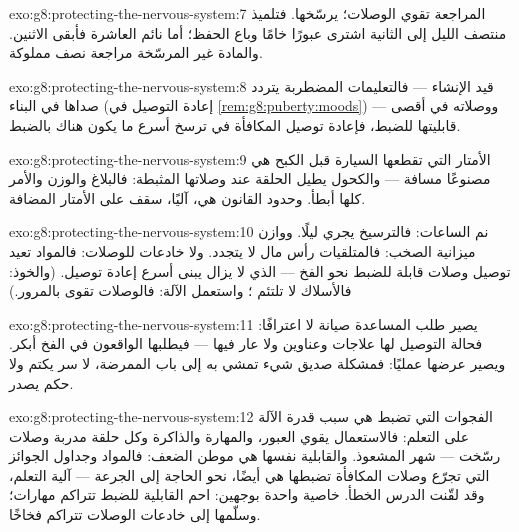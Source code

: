 \begin{solution}{exo:g8:protecting-the-nervous-system:7}
المراجعة تقوي الوصلات؛  يرسّخها. فتلميذ منتصف
الليل إلى الثانية اشترى عبورًا خامًا وباع الحفظ؛ أما
نائم العاشرة فأبقى الاثنين. والمادة غير المرسّخة مراجعة
نصف مملوكة.
\end{solution}

\begin{solution}{exo:g8:protecting-the-nervous-system:8}
  قيد الإنشاء --- فالتعليمات المضطربة
يتردد صداها في البناء (إعادة التوصيل في
\cref{rem:g8:puberty:moods}) --- ووصلاته في أقصى
قابليتها للضبط، فإعادة توصيل المكافأة في  ترسخ
أسرع ما يكون هناك بالضبط.
\end{solution}

\begin{solution}{exo:g8:protecting-the-nervous-system:9}
الأمتار التي تقطعها السيارة قبل الكبح هي 
مصنوعًا مسافة --- والكحول يطيل الحلقة عند وصلاتها
المثبطة: فالبلاغ والوزن والأمر كلها أبطأ. وحدود القانون
هي، آليًا، سقف على الأمتار المضافة.
\end{solution}

\begin{solution}{exo:g8:protecting-the-nervous-system:10}
نم الساعات: فالترسيخ يجري ليلًا. ووازن ميزانية الصخب:
فالمتلقيات رأس مال لا يتجدد. ولا خادعات للوصلات:
فالمواد تعيد توصيل وصلات قابلة للضبط نحو الفخ ---
 الذي لا يزال يبنى أسرع إعادة توصيل. (والخوذ:
فالأسلاك لا تلتئم ؛ واستعمل الآلة: فالوصلات تقوى
بالمرور.)
\end{solution}

\begin{solution}{exo:g8:protecting-the-nervous-system:11}
يصير طلب المساعدة صيانة لا اعترافًا: فحالة التوصيل لها
علاجات وعناوين ولا عار فيها --- فيطلبها الواقعون في الفخ
أبكر. ويصير عرضها عمليًا: فمشكلة صديق شيء تمشي به إلى
باب الممرضة، لا سر يكتم ولا حكم يصدر.
\end{solution}

\begin{solution}{exo:g8:protecting-the-nervous-system:12}
الفجوات التي تضبط هي سبب قدرة الآلة على التعلم:
فالاستعمال يقوي العبور، والمهارة والذاكرة وكل حلقة مدربة
وصلات رسّخت --- شهر المشعوذ. والقابلية نفسها هي موطن
الضعف: فالمواد وجداول الجوائز التي تجرّع وصلات المكافأة
تضبطها هي أيضًا، نحو الحاجة إلى الجرعة ---  آلية
التعلم، وقد لقّنت الدرس الخطأ. خاصية واحدة بوجهين: احم
القابلية للضبط تتراكم مهارات؛ وسلّمها إلى خادعات الوصلات
تتراكم فخاخًا.
\end{solution}

